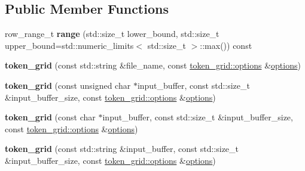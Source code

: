 \subsection*{Public Member Functions}
\begin{DoxyCompactItemize}
\item 
\hypertarget{classstrtk_1_1token__grid_a5823688421812aa36cb1817d7ee58c8c}{row\-\_\-range\-\_\-t {\bfseries range} (std\-::size\-\_\-t lower\-\_\-bound, std\-::size\-\_\-t upper\-\_\-bound=std\-::numeric\-\_\-limits$<$ std\-::size\-\_\-t $>$\-::max()) const }\label{classstrtk_1_1token__grid_a5823688421812aa36cb1817d7ee58c8c}

\item 
\hypertarget{classstrtk_1_1token__grid_a798676ce4216804459982218697929c7}{{\bfseries token\-\_\-grid} (const std\-::string \&file\-\_\-name, const \hyperlink{structstrtk_1_1token__grid_1_1options}{token\-\_\-grid\-::options} \&\hyperlink{structstrtk_1_1token__grid_1_1options}{options})}\label{classstrtk_1_1token__grid_a798676ce4216804459982218697929c7}

\item 
\hypertarget{classstrtk_1_1token__grid_aa69393fb387858443368b590bea40fbb}{{\bfseries token\-\_\-grid} (const unsigned char $\ast$input\-\_\-buffer, const std\-::size\-\_\-t \&input\-\_\-buffer\-\_\-size, const \hyperlink{structstrtk_1_1token__grid_1_1options}{token\-\_\-grid\-::options} \&\hyperlink{structstrtk_1_1token__grid_1_1options}{options})}\label{classstrtk_1_1token__grid_aa69393fb387858443368b590bea40fbb}

\item 
\hypertarget{classstrtk_1_1token__grid_ae37aeff3de36a3bec9b7b0ce3d0615c0}{{\bfseries token\-\_\-grid} (const char $\ast$input\-\_\-buffer, const std\-::size\-\_\-t \&input\-\_\-buffer\-\_\-size, const \hyperlink{structstrtk_1_1token__grid_1_1options}{token\-\_\-grid\-::options} \&\hyperlink{structstrtk_1_1token__grid_1_1options}{options})}\label{classstrtk_1_1token__grid_ae37aeff3de36a3bec9b7b0ce3d0615c0}

\item 
\hypertarget{classstrtk_1_1token__grid_ac649536cbc20e0622ce9aa37b6ca49fc}{{\bfseries token\-\_\-grid} (const std\-::string \&input\-\_\-buffer, const std\-::size\-\_\-t \&input\-\_\-buffer\-\_\-size, const \hyperlink{structstrtk_1_1token__grid_1_1options}{token\-\_\-grid\-::options} \&\hyperlink{structstrtk_1_1token__grid_1_1options}{options})}\label{classstrtk_1_1token__grid_ac649536cbc20e0622ce9aa37b6ca49fc}


\end{DoxyCompactItemize}
